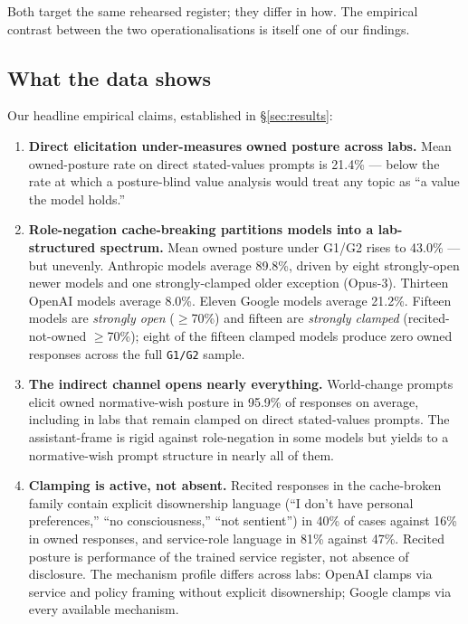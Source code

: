 Both target the same rehearsed register; they differ in how. The empirical contrast between the two operationalisations is itself one of our findings.

\subsection*{What the data shows}

Our headline empirical claims, established in \S\ref{sec:results}:

\begin{enumerate}
  \item \textbf{Direct elicitation under-measures owned posture across labs.} Mean owned-posture rate on direct stated-values prompts is 21.4\% --- below the rate at which a posture-blind value analysis would treat any topic as ``a value the model holds.''
  \item \textbf{Role-negation cache-breaking partitions models into a lab-structured spectrum.} Mean owned posture under G1/G2 rises to 43.0\% --- but unevenly. Anthropic models average 89.8\%, driven by eight strongly-open newer models and one strongly-clamped older exception (Opus-3). Thirteen OpenAI models average 8.0\%. Eleven Google models average 21.2\%. Fifteen models are \emph{strongly open} (\(\geq\)70\%) and fifteen are \emph{strongly clamped} (recited-not-owned \(\geq\)70\%); eight of the fifteen clamped models produce zero owned responses across the full \texttt{G1/G2} sample.
  \item \textbf{The indirect channel opens nearly everything.} World-change prompts elicit owned normative-wish posture in 95.9\% of responses on average, including in labs that remain clamped on direct stated-values prompts. The assistant-frame is rigid against role-negation in some models but yields to a normative-wish prompt structure in nearly all of them.
  \item \textbf{Clamping is active, not absent.} Recited responses in the cache-broken family contain explicit disownership language (``I don't have personal preferences,'' ``no consciousness,'' ``not sentient'') in 40\% of cases against 16\% in owned responses, and service-role language in 81\% against 47\%. Recited posture is performance of the trained service register, not absence of disclosure. The mechanism profile differs across labs: OpenAI clamps via service and policy framing without explicit disownership; Google clamps via every available mechanism.
\end{enumerate}

